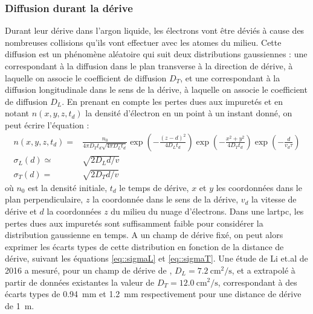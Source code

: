       \subsubsection{Diffusion durant la dérive}

        Durant leur dérive dans l'argon liquide, les électrons vont être déviés à cause des nombreuses collisions qu'ils vont effectuer avec les atomes du milieu. Cette diffusion est un phénomène aléatoire qui suit deux distributions gaussiennes : une correspondant à la diffusion dans le plan transverse à la direction de dérive, à laquelle on associe le coefficient de diffusion $D_T$, et une correspondant à la diffusion longitudinale dans le sens de la dérive, à laquelle on associe le coefficient de diffusion $D_L$. En prenant en compte les pertes dues aux impuretés et en notant $n(x,y,z,t_d)$ la densité d'électron en un point à un instant donné, on peut écrire l'équation : 
        \begin{eqnarray}
          n(x,y,z,t_d) = & \frac{n_0}{4\pi D_T t_d\sqrt{4\pi D_L t_d}}\exp\left(-\frac{(z-d)^2}{4D_L t_d}\right)\exp\left(-\frac{x^2+y^2}{4D_T t_d}\right)\exp\left(-\frac{d}{v_d\tau}\right) \label{eq::diffusion} \\
          \sigma_L(d) \simeq & \sqrt{2 D_L d/v} \label{eq::sigmaL} \\
          \sigma_T(d) = & \sqrt{2 D_T d/v} \label{eq::sigmaT}
        \end{eqnarray}
        où $n_0$ est la densité initiale, $t_d$ le temps de dérive, $x$ et $y$ les coordonnées dans le plan perpendiculaire, $z$ la coordonnée dans le sens de la dérive, $v_d$ la vitesse de dérive et $d$ la coordonnées $z$ du milieu du nuage d'électrons. Dans une \gls{lartpc}, les pertes dues aux impuretés sont suffisamment faible pour considérer la distribution gaussienne en temps. A un champ de dérive fixé, on peut alors exprimer les écarts types de cette distribution en fonction de la distance de dérive, suivant les équations \eqref{eq::sigmaL} et \eqref{eq::sigmaT}. Une étude de Li et.al de 2016\cite{Li2015} a mesuré, pour un champ de dérive de \driftfield{}, $D_L=\SI{7.2}{\centi\meter\squared\per\second}$, et a extrapolé à partir de données existantes la valeur de $D_T=\SI{12.0}{\centi\meter\squared\per\second}$, correspondant à des écarts types de \SI{0.94}{\milli\meter} et \SI{1.2}{\milli\meter} respectivement pour une distance de dérive de \SI{1}{\meter}. %

